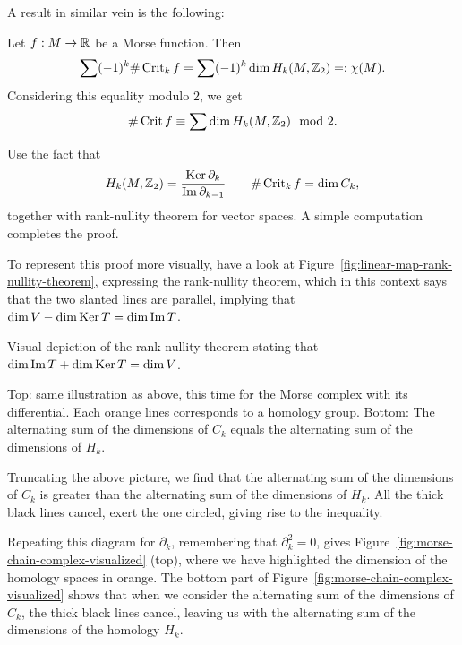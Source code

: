 A result in similar vein is the following:
\begin{theorem}
    Let $f: M \to  \mathbb{R}$ be a Morse function. Then
    \[
        \sum (-1)^{k} \# \operatorname{Crit}_k f = \sum (-1)^{k} \dim H_k(M, \mathbb{Z}_2)  =: \chi(M)
    .\]
    Considering this equality modulo $2$, we get
    \[
        \# \operatorname{Crit} f  \equiv \sum \dim H_k(M, \mathbb{Z}_2) \mod 2
    .\]
\end{theorem}
\begin{myproof}
    Use the fact that 
    \[
        H_k(M, \mathbb{Z}_2) = \frac{\operatorname{Ker} \partial_k}{\operatorname{Im} \partial_{k-1}} \qquad \# \operatorname{Crit}_k f = \dim C_k,
    \]
    together with rank-nullity theorem for vector spaces.
    A simple computation completes the proof.

    To represent this proof more visually, have a look at Figure~\ref{fig:linear-map-rank-nullity-theorem}, expressing the rank-nullity theorem, which in this context says that the two slanted lines are parallel, implying that $\dim V - \dim \operatorname{Ker} T = \dim \operatorname{Im} T$.
    \begin{marginfigure}
        \centering
        \caption{Visual depiction of the rank-nullity theorem stating that $\dim \operatorname{Im} T + \dim \operatorname{Ker} T = \dim V$.}
        \label{fig:linear-map-rank-nullity-theorem}
    \end{marginfigure}
    \begin{marginfigure}
        \centering
        \caption{
            Top: same illustration as above, this time for the Morse complex with its differential.
            Each orange lines corresponds to a homology group.
            Bottom: The alternating sum of the dimensions of $C_k$ equals the alternating sum of the dimensions of $H_k$.
        }
        \label{fig:morse-chain-complex-visualized}
    \end{marginfigure}
    \begin{marginfigure}
        \centering
        \caption{Truncating the above picture, we find that the alternating sum of the dimensions of $C_k$ is greater than the alternating sum of the dimensions of  $H_k$. All the thick black lines cancel, exert the one circled, giving rise to the inequality.
        }
        \label{fig:morse-chain-complex-visualized-truncated}
    \end{marginfigure}
    Repeating this diagram for $\partial_k$, remembering that  $\partial_k^2 = 0$, gives Figure~\ref{fig:morse-chain-complex-visualized} (top), where we have highlighted the dimension of the homology spaces in orange.
    The bottom part of Figure~\ref{fig:morse-chain-complex-visualized} shows that when we consider the alternating sum of the dimensions of $C_k$, the thick black lines cancel, leaving us with the alternating sum of the dimensions of the homology $H_k$.
    \end{myproof}

